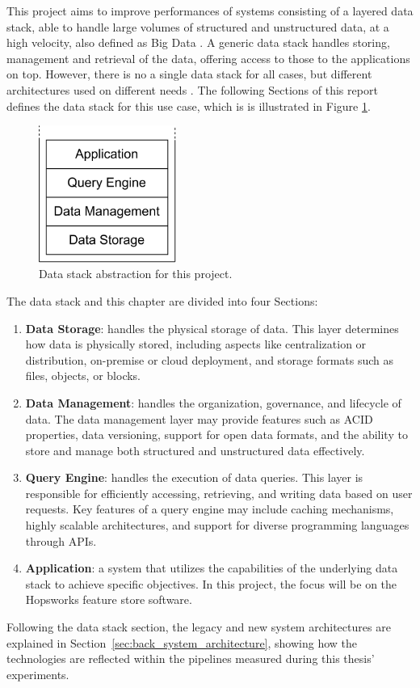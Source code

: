 This project aims to improve performances of systems consisting of a layered data stack, able to handle large volumes of structured and unstructured data, at a high velocity, also defined as Big Data \cite{PDFBigData2024}. 
A generic data stack handles storing, management and retrieval of the data, offering access to those to the applications on top. However, there is no a single data stack for all cases, but different architectures used on different needs \cite{framptonCompleteGuideOpen2018,sakrBigDataProcessing2017,IcebergExamples2024}. The following Sections of this report defines the data stack for this use case, which is is illustrated in Figure \ref{fig:datastack}.

\begin{figure}[!ht]
    \begin{center}
      \includegraphics[width=0.4\textwidth]{figures/2-background_and_related_work/datastack.png}
    \end{center}
    \caption[Data stack abstraction]{Data stack abstraction for this project.}
    \label{fig:datastack}
\end{figure}

The data stack and this chapter are divided into four Sections:
\begin{enumerate}
    \item \textbf{Data Storage}: handles the physical storage of data. This layer determines how data is physically stored, including aspects like centralization or distribution, on-premise or cloud deployment, and storage formats such as files, objects, or blocks.
    \item \textbf{Data Management}: handles the organization, governance, and lifecycle of data. The data management layer may provide features such as \gls{ACID} properties, data versioning, support for open data formats, and the ability to store and manage both structured and unstructured data effectively.
    \item \textbf{Query Engine}: handles the execution of data queries. This layer is responsible for efficiently accessing, retrieving, and writing data based on user requests. Key features of a query engine may include caching mechanisms, highly scalable architectures, and support for diverse programming languages through \glspl{API}.
    \item \textbf{Application}: a system that utilizes the capabilities of the underlying data stack to achieve specific objectives. In this project, the focus will be on the Hopsworks feature store software.
\end{enumerate}

Following the data stack section, the legacy and new system architectures are explained in Section~\ref{sec:back_system_architecture}, showing how the technologies are reflected within the pipelines measured during this thesis' experiments.